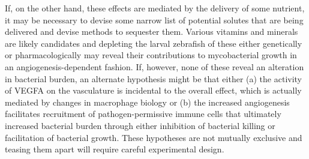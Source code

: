 If, on the other hand, these effects are mediated by the delivery of some nutrient, it may be necessary to devise some narrow list of potential solutes that are being delivered and devise methods to sequester them. Various vitamins and minerals are likely candidates and depleting the larval zebrafish of these either genetically or pharmacologically may reveal their contributions to mycobacterial growth in an angiogenesis\hyp{}dependent fashion. If, however, none of these reveal an alteration in bacterial burden, an alternate hypothesis might be that either (a) the activity of VEGFA on the vasculature is incidental to the overall effect, which is actually mediated by changes in macrophage biology or (b) the increased angiogenesis facilitates recruitment of pathogen\hyp{}permissive immune cells that ultimately increased bacterial burden through either inhibition of bacterial killing or facilitation of bacterial growth. These hypotheses are not mutually exclusive and teasing them apart will require careful experimental design.

